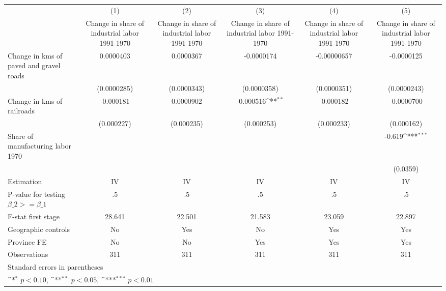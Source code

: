 {
\def\sym#1{\ifmmode^{#1}\else\(^{#1}\)\fi}
\begin{tabular}{l*{5}{c}}
\hline\hline
                    &\multicolumn{1}{c}{(1)}&\multicolumn{1}{c}{(2)}&\multicolumn{1}{c}{(3)}&\multicolumn{1}{c}{(4)}&\multicolumn{1}{c}{(5)}\\
                    &\multicolumn{1}{c}{Change in share of industrial labor 1991-1970}&\multicolumn{1}{c}{Change in share of industrial labor 1991-1970}&\multicolumn{1}{c}{Change in share of industrial labor 1991-1970}&\multicolumn{1}{c}{Change in share of industrial labor 1991-1970}&\multicolumn{1}{c}{Change in share of industrial labor 1991-1970}\\
\hline
Change in kms of paved and gravel roads&   0.0000403         &   0.0000367         &  -0.0000174         & -0.00000657         &  -0.0000125         \\
                    & (0.0000285)         & (0.0000343)         & (0.0000358)         & (0.0000351)         & (0.0000243)         \\
[1em]
Change in kms of railroads&   -0.000181         &   0.0000902         &   -0.000516\sym{**} &   -0.000182         &  -0.0000700         \\
                    &  (0.000227)         &  (0.000235)         &  (0.000253)         &  (0.000233)         &  (0.000162)         \\
[1em]
Share of manufacturing labor 1970&                     &                     &                     &                     &      -0.619\sym{***}\\
                    &                     &                     &                     &                     &    (0.0359)         \\
\hline
Estimation          &          IV         &          IV         &          IV         &          IV         &          IV         \\
P-value for testing $\beta\_2 >= \beta\_1$&          .5         &          .5         &          .5         &          .5         &          .5         \\
F-stat first stage  &      28.641         &      22.501         &      21.583         &      23.059         &      22.897         \\
Geographic controls &          No         &         Yes         &          No         &         Yes         &         Yes         \\
Province FE         &          No         &          No         &         Yes         &         Yes         &         Yes         \\
Observations        &         311         &         311         &         311         &         311         &         311         \\
\hline\hline
\multicolumn{6}{l}{\footnotesize Standard errors in parentheses}\\
\multicolumn{6}{l}{\footnotesize \sym{*} \(p<0.10\), \sym{**} \(p<0.05\), \sym{***} \(p<0.01\)}\\
\end{tabular}
}
